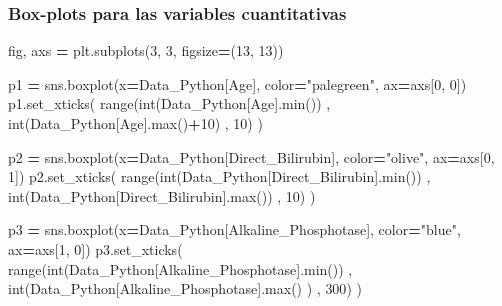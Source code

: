 \documentclass[
  11pt,
  a4paper,
]{article}
\newenvironment{Shaded}{\begin{snugshade}}{\end{snugshade}}
\newcommand{\BuiltInTok}[1]{#1}
\newcommand{\DecValTok}[1]{\textcolor[rgb]{0.00,0.00,0.81}{#1}}
\newcommand{\NormalTok}[1]{#1}
\newcommand{\OperatorTok}[1]{\textcolor[rgb]{0.81,0.36,0.00}{\textbf{#1}}}
\newcommand{\StringTok}[1]{\textcolor[rgb]{0.31,0.60,0.02}{#1}}
\begin{document}
\newpage

\hypertarget{box-plots-para-las-variables-cuantitativas}{%
\subsubsection{\texorpdfstring{Box-plots para las variables
cuantitativas
}{Box-plots para las variables cuantitativas }}\label{box-plots-para-las-variables-cuantitativas}}

\begin{Shaded}
\begin{Highlighting}[]
\NormalTok{fig, axs }\OperatorTok{=}\NormalTok{ plt.subplots(}\DecValTok{3}\NormalTok{, }\DecValTok{3}\NormalTok{, figsize}\OperatorTok{=}\NormalTok{(}\DecValTok{13}\NormalTok{, }\DecValTok{13}\NormalTok{))}

\NormalTok{p1 }\OperatorTok{=}\NormalTok{ sns.boxplot(x}\OperatorTok{=}\NormalTok{Data\_Python[}\StringTok{\textquotesingle{}Age\textquotesingle{}}\NormalTok{], color}\OperatorTok{=}\StringTok{"palegreen"}\NormalTok{, ax}\OperatorTok{=}\NormalTok{axs[}\DecValTok{0}\NormalTok{, }\DecValTok{0}\NormalTok{])}
\NormalTok{p1.set\_xticks( }\BuiltInTok{range}\NormalTok{(}\BuiltInTok{int}\NormalTok{(Data\_Python[}\StringTok{\textquotesingle{}Age\textquotesingle{}}\NormalTok{].}\BuiltInTok{min}\NormalTok{()) , }\BuiltInTok{int}\NormalTok{(Data\_Python[}\StringTok{\textquotesingle{}Age\textquotesingle{}}\NormalTok{].}\BuiltInTok{max}\NormalTok{()}\OperatorTok{+}\DecValTok{10}\NormalTok{) , }\DecValTok{10}\NormalTok{) )}

\NormalTok{p2 }\OperatorTok{=}\NormalTok{ sns.boxplot(x}\OperatorTok{=}\NormalTok{Data\_Python[}\StringTok{\textquotesingle{}Direct\_Bilirubin\textquotesingle{}}\NormalTok{], color}\OperatorTok{=}\StringTok{"olive"}\NormalTok{, ax}\OperatorTok{=}\NormalTok{axs[}\DecValTok{0}\NormalTok{, }\DecValTok{1}\NormalTok{])}
\NormalTok{p2.set\_xticks( }\BuiltInTok{range}\NormalTok{(}\BuiltInTok{int}\NormalTok{(Data\_Python[}\StringTok{\textquotesingle{}Direct\_Bilirubin\textquotesingle{}}\NormalTok{].}\BuiltInTok{min}\NormalTok{()) , }\BuiltInTok{int}\NormalTok{(Data\_Python[}\StringTok{\textquotesingle{}Direct\_Bilirubin\textquotesingle{}}\NormalTok{].}\BuiltInTok{max}\NormalTok{()) , }\DecValTok{10}\NormalTok{) )}

\NormalTok{p3 }\OperatorTok{=}\NormalTok{ sns.boxplot(x}\OperatorTok{=}\NormalTok{Data\_Python[}\StringTok{\textquotesingle{}Alkaline\_Phosphotase\textquotesingle{}}\NormalTok{], color}\OperatorTok{=}\StringTok{"blue"}\NormalTok{, ax}\OperatorTok{=}\NormalTok{axs[}\DecValTok{1}\NormalTok{, }\DecValTok{0}\NormalTok{])}
\NormalTok{p3.set\_xticks( }\BuiltInTok{range}\NormalTok{(}\BuiltInTok{int}\NormalTok{(Data\_Python[}\StringTok{\textquotesingle{}Alkaline\_Phosphotase\textquotesingle{}}\NormalTok{].}\BuiltInTok{min}\NormalTok{()) , }\BuiltInTok{int}\NormalTok{(Data\_Python[}\StringTok{\textquotesingle{}Alkaline\_Phosphotase\textquotesingle{}}\NormalTok{].}\BuiltInTok{max}\NormalTok{() ) , }\DecValTok{300}\NormalTok{) )}


\end{Highlighting}
\end{Shaded}
\end{document}
